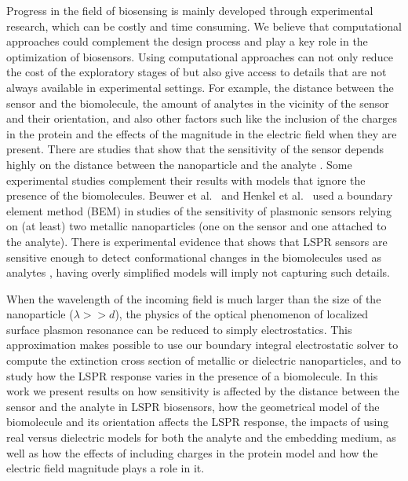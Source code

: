 Progress in the field of biosensing is mainly developed through experimental research, which can be costly and time consuming. We believe that 
computational approaches could complement the design process and play a key role in the optimization of biosensors. Using computational approaches
can not only reduce the cost of the exploratory stages of but also give access to details that are not always available in experimental settings. For example, 
the distance between the sensor and the biomolecule, the amount of analytes in the vicinity of the sensor and their orientation, and also other factors such like
the inclusion of the charges in the protein and the effects of the magnitude in the electric field when they are present. There are studies that show that 
the sensitivity of the sensor depends highly on the distance between the nanoparticle and the analyte \cite{HaesETal2004}. Some experimental studies complement
their results with models that ignore the presence of the biomolecules. Beuwer et al.~\cite{BeuwervanHoofZijlstra2018} and Henkel et al.~\cite{HenkelETal2018} 
used a boundary element method (BEM) in studies of the sensitivity of plasmonic sensors relying on (at least) two metallic nanoparticles 
(one on the sensor and one attached to the analyte). There is experimental evidence that shows that LSPR sensors are sensitive enough to detect conformational
changes in the biomolecules used as analytes \cite{HallETal2011}, having overly simplified models will imply not capturing such details. 


When the wavelength of the incoming field is much larger than the size of the nanoparticle ($\lambda>>d$), the physics of the optical phenomenon of 
localized surface plasmon resonance can be reduced to simply electrostatics. This approximation makes possible to use our boundary integral 
electrostatic solver \pygbe to compute the extinction cross section of metallic or dielectric nanoparticles, and to study how the LSPR response varies in the 
presence of a biomolecule. In this work we present results on how sensitivity is affected by the distance between the sensor and the analyte in LSPR biosensors, 
how the geometrical model of the biomolecule and its orientation affects the LSPR response, the impacts of using real versus dielectric models for both 
the analyte and the embedding medium, as well as how the effects of including charges in the protein model and how the electric field magnitude
plays a role in it.

